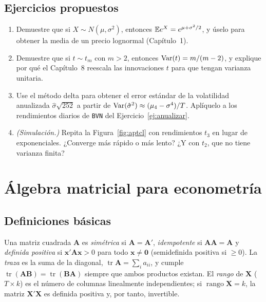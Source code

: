 \section{Ejercicios propuestos}

\begin{enumerate}[label=\textbf{A.\arabic*},leftmargin=*,itemsep=6pt]
  \item Demuestre que si $X\sim N(\mu,\sigma^2)$, entonces $\mathbb{E} e^{X}=e^{\mu+\sigma^2/2}$, y úselo para
        obtener la media de un precio lognormal (Capítulo~1).
  \item Demuestre que si $t\sim t_m$ con $m>2$, entonces $\operatorname{Var}(t)=m/(m-2)$, y explique por qué el
        Capítulo~8 reescala las innovaciones $t$ para que tengan varianza unitaria.
  \item Use el método delta para obtener el error estándar de la volatilidad anualizada
        $\hat\sigma\sqrt{252}$ a partir de $\operatorname{Var}(\hat\sigma^2)\approx(\mu_4-\sigma^4)/T$. Aplíquelo a los
        rendimientos diarios de \texttt{BVN} del Ejercicio~\ref{ej:anualizar}.
  \item \emph{(Simulación.)} Repita la Figura~\ref{fig:aptcl} con rendimientos $t_3$ en lugar de
        exponenciales. ¿Converge más rápido o más lento? ¿Y con $t_2$, que no tiene varianza finita?
\end{enumerate}

\chapter{Álgebra matricial para econometría}\label{ap:matrices}

\section{Definiciones básicas}

Una matriz cuadrada $\bm A$ es \emph{simétrica} si $\bm A=\bm A'$, \emph{idempotente} si $\bm A\bm A=\bm A$
y \emph{definida positiva} si $\bm x'\bm A\bm x>0$ para todo $\bm x\ne\bm0$ (semidefinida positiva si
$\ge0$). La \emph{traza} es la suma de la diagonal, $\operatorname{tr}\bm A=\sum_ia_{ii}$, y cumple
$\operatorname{tr}(\bm A\bm B)=\operatorname{tr}(\bm B\bm A)$ siempre que ambos productos existan. El
\emph{rango} de $\bm X$ ($T\times k$) es el número de columnas linealmente independientes; si
$\operatorname{rango}\bm X=k$, la matriz $\bm X'\bm X$ es definida positiva y, por tanto, invertible.

